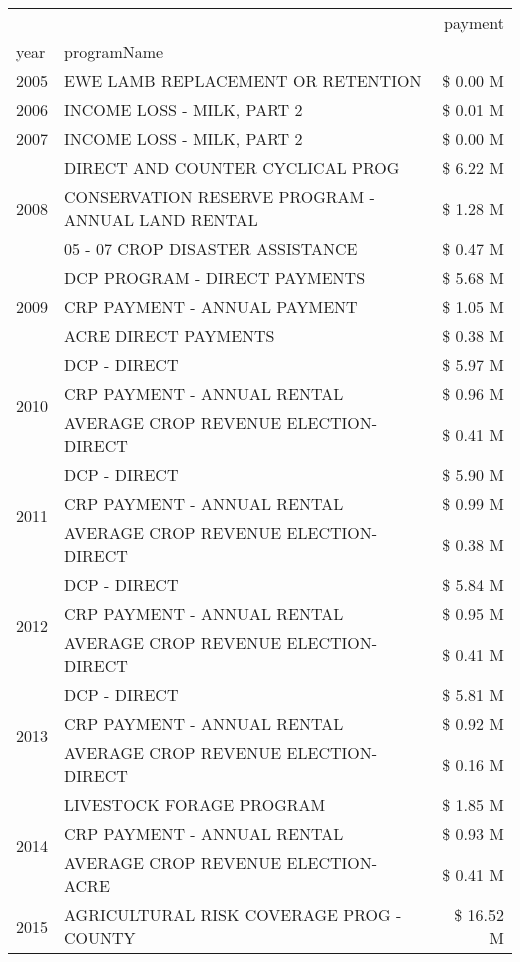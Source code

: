 \begin{tabular}{llr}
\toprule
 &  & payment \\
year & programName &  \\
\midrule
2005 & EWE LAMB REPLACEMENT OR RETENTION & \$ 0.00 M \\
\cline{1-3}
2006 & INCOME LOSS - MILK, PART 2 & \$ 0.01 M \\
\cline{1-3}
2007 & INCOME LOSS - MILK, PART 2 & \$ 0.00 M \\
\cline{1-3}
\multirow[t]{3}{*}{2008} & DIRECT AND COUNTER CYCLICAL PROG & \$ 6.22 M \\
 & CONSERVATION RESERVE PROGRAM - ANNUAL LAND RENTAL & \$ 1.28 M \\
 & 05 - 07 CROP DISASTER ASSISTANCE & \$ 0.47 M \\
\cline{1-3}
\multirow[t]{3}{*}{2009} & DCP PROGRAM - DIRECT PAYMENTS & \$ 5.68 M \\
 & CRP PAYMENT - ANNUAL PAYMENT & \$ 1.05 M \\
 & ACRE DIRECT PAYMENTS & \$ 0.38 M \\
\cline{1-3}
\multirow[t]{3}{*}{2010} & DCP - DIRECT & \$ 5.97 M \\
 & CRP PAYMENT - ANNUAL RENTAL & \$ 0.96 M \\
 & AVERAGE CROP REVENUE ELECTION-DIRECT & \$ 0.41 M \\
\cline{1-3}
\multirow[t]{3}{*}{2011} & DCP - DIRECT & \$ 5.90 M \\
 & CRP PAYMENT - ANNUAL RENTAL & \$ 0.99 M \\
 & AVERAGE CROP REVENUE ELECTION-DIRECT & \$ 0.38 M \\
\cline{1-3}
\multirow[t]{3}{*}{2012} & DCP - DIRECT & \$ 5.84 M \\
 & CRP PAYMENT - ANNUAL RENTAL & \$ 0.95 M \\
 & AVERAGE CROP REVENUE ELECTION-DIRECT & \$ 0.41 M \\
\cline{1-3}
\multirow[t]{3}{*}{2013} & DCP - DIRECT & \$ 5.81 M \\
 & CRP PAYMENT - ANNUAL RENTAL & \$ 0.92 M \\
 & AVERAGE CROP REVENUE ELECTION-DIRECT & \$ 0.16 M \\
\cline{1-3}
\multirow[t]{3}{*}{2014} & LIVESTOCK FORAGE PROGRAM & \$ 1.85 M \\
 & CRP PAYMENT - ANNUAL RENTAL & \$ 0.93 M \\
 & AVERAGE CROP REVENUE ELECTION-ACRE & \$ 0.41 M \\
\cline{1-3}
\multirow[t]{3}{*}{2015} & AGRICULTURAL RISK COVERAGE PROG - COUNTY & \$ 16.52 M \\

\end{tabular}
